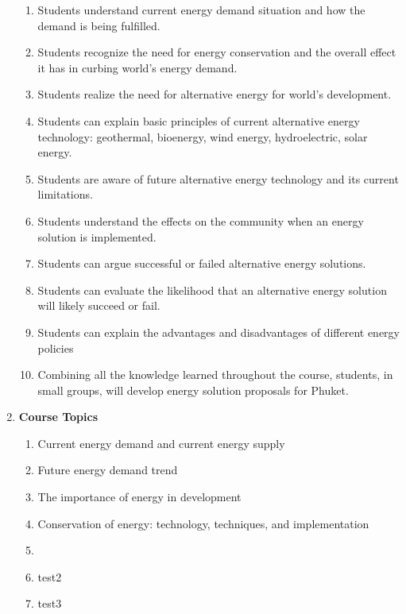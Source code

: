 \documentclass[a4paper,12pt]{article}
\begin{document}
\begin{enumerate}[label=\textbf{\Alph*}]
\begin{enumerate}[label=\arabic*.]
        \item Students understand current energy demand situation and how the demand is being fulfilled.
        \item Students recognize the need for energy conservation and the overall effect it has in curbing world's energy demand.
        \item Students realize the need for alternative energy for world's development.
        \item Students can explain basic principles of current alternative energy technology: geothermal, bioenergy, wind energy, hydroelectric, solar energy. 
        \item Students are aware of future alternative energy technology and its current limitations.
        \item Students understand the effects on the community when an energy solution is implemented.
        \item Students can argue successful or failed alternative energy solutions.
        \item Students can evaluate the likelihood that an alternative energy solution will likely succeed or fail.
        \item Students can explain the advantages and disadvantages of different energy policies
        \item Combining all the knowledge learned throughout the course, students, in small groups, will develop energy solution proposals for Phuket.
    \end{enumerate}
    
    \item \textbf{Course Topics} \hfill \\
    \begin{enumerate}[label=\arabic*.]
        \item Current energy demand and current energy supply
        \item Future energy demand trend
        \item The importance of energy in development
        \item Conservation of energy: technology, techniques, and implementation
        \item 
        \item test2
        \item test3
    \end{enumerate}

\end{enumerate}
\end{document}
